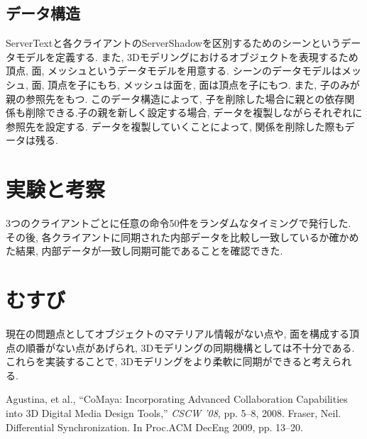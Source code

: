 \documentclass{AIabst}
\begin{document}
  \subsection{データ構造}
  ServerTextと各クライアントのServerShadowを区別するためのシーンというデータモデルを定義する.
  また, 3Dモデリングにおけるオブジェクトを表現するため頂点, 面, メッシュというデータモデルを用意する.
  シーンのデータモデルはメッシュ, 面, 頂点を子にもち, メッシュは面を, 面は頂点を子にもつ. また, 子のみが親の参照先をもつ. このデータ構造によって, 子を削除した場合に親との依存関係も削除できる.子の親を新しく設定する場合, データを複製しながらそれぞれに参照先を設定する. データを複製していくことによって, 関係を削除した際もデータは残る.
\section{実験と考察}
 3つのクライアントごとに任意の命令50件をランダムなタイミングで発行した.
 その後, 各クライアントに同期された内部データを比較し一致しているか確かめた結果, 内部データが一致し同期可能であることを確認できた.
\section{むすび}
 現在の問題点としてオブジェクトのマテリアル情報がない点や, 面を構成する頂点の順番がない点があげられ, 3Dモデリングの同期機構としては不十分である.
これらを実装することで, 3Dモデリングをより柔軟に同期ができると考えられる.

\begin{thebibliography}{9}
	Agustina, et al., ``CoMaya: Incorporating Advanced Collaboration Capabilities into 3D Digital Media Design Tools,'' {\it CSCW '08}, pp. 5--8, 2008.
  Fraser,	Neil.	Differential Synchronization. In Proc.ACM DecEng 2009, pp. 13--20.
\end{thebibliography}
\end{document}
